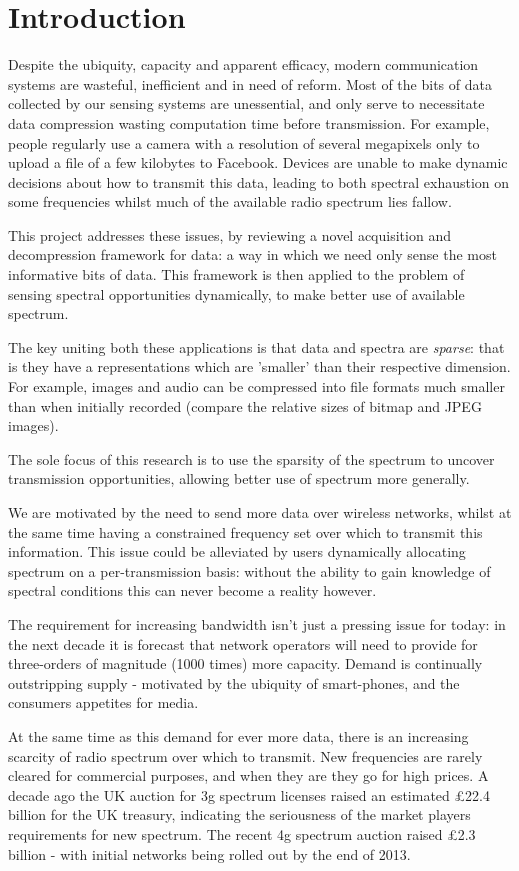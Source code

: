 \section{Introduction}
Despite the ubiquity, capacity and apparent efficacy, modern communication systems are wasteful, inefficient and in need of reform. Most of the bits of data collected by our sensing systems are unessential, and only serve to necessitate data compression wasting computation time before transmission. For example, people regularly use a camera with a resolution of several megapixels only to upload a file of a few kilobytes to Facebook. Devices are unable to make dynamic decisions about how to transmit this data, leading to both spectral exhaustion on some frequencies whilst much of the available radio spectrum lies fallow. 

This project addresses these issues, by reviewing a novel acquisition and decompression framework for data: a way in which we need only sense the most informative bits of data. This framework is then applied to the problem of sensing spectral opportunities dynamically, to make better use of available spectrum. 

The key uniting both these applications is that data and spectra are \textit{sparse}: that is they have a representations which are 'smaller' than their respective dimension. For example, images and audio can be compressed into file formats much smaller than when initially recorded (compare the relative sizes of bitmap and JPEG images).

The sole focus of this research is to use the sparsity of the spectrum to uncover transmission opportunities, allowing better use of spectrum more generally. 

We are motivated by the need to send more data over wireless networks, whilst at the same time having a constrained frequency set over which to transmit this information. This issue could be alleviated by users dynamically allocating spectrum on a per-transmission basis: without the ability to gain knowledge of spectral conditions this can never become a reality however. 

The requirement for increasing bandwidth isn't just a pressing issue for today: in the next decade it is forecast that network operators will need to provide for three-orders of magnitude (1000 times) more capacity. Demand is continually outstripping supply - motivated by the ubiquity of smart-phones, and the consumers appetites for media. 

At the same time as this demand for ever more data, there is an increasing scarcity of radio spectrum over which to transmit. New frequencies are rarely cleared for commercial purposes, and when they are they go for high prices.  A decade ago the UK auction for 3g spectrum licenses raised an estimated £22.4 billion \cite{Ukmobil} for the UK treasury, indicating the seriousness of the market players requirements for new spectrum. The recent 4g spectrum auction raised £2.3 billion \cite{BBC News}- with initial networks being rolled out by the end of 2013.

